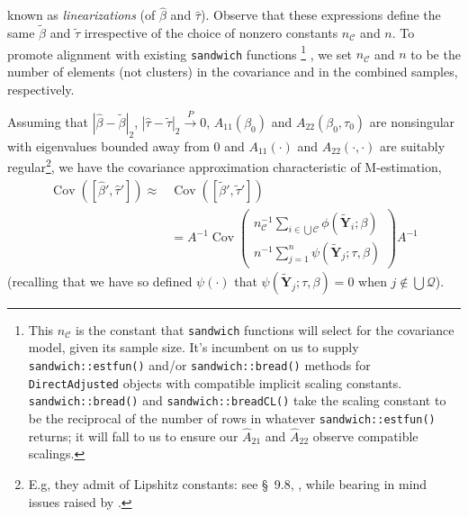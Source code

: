 \documentclass{article}
\begin{document}
known as \textit{linearizations} (of $\hat\beta$ and $\hat\tau$).
Observe that these expressions define the same $\tilde\beta$ and $\tilde\tau$
  irrespective of the choice of nonzero constants $n_{\mathcal{C}}$
  and $n$.  To promote alignment with existing \texttt{sandwich}
  functions%
  \footnote{%
    This $n_{\mathcal{C}}$ is the constant that \texttt{sandwich} functions
will select for the covariance model, given its sample size.  It's
incumbent on us to supply \texttt{sandwich::estfun()} and/or
\texttt{sandwich::bread()} methods for \texttt{DirectAdjusted} objects
with compatible implicit
scaling constants. \texttt{sandwich::bread()} and
\texttt{sandwich::breadCL()} take the scaling constant to be the
reciprocal of the number of rows in whatever
\texttt{sandwich::estfun()} returns; it will fall to us to ensure our
$\hat{A}_{21}$ and $\hat{A}_{22}$ observe compatible scalings.}%
, we set $n_{\mathcal{C}}$ and $n$ to be the number of elements
(not clusters) in the covariance and in the combined samples,
respectively.

Assuming that $|\hat\beta -\tilde\beta|_{2}$, 
$|\hat\tau -\tilde\tau|_{2} \stackrel{P}{\rightarrow} 0$,
$A_{11}(\beta_{0})$ and $A_{22}(\beta_{0}, \tau_{0})$ are nonsingular
with eigenvalues bounded away from 0 and $A_{11}(\cdot)$ and $A_{22}(\cdot, \cdot)$ are suitably
regular\footnote{E.g, they admit of Lipshitz constants: see \S~9.8,
  , while bearing in mind issues raised
  by .}, 
we have the covariance approximation characteristic of M-estimation,
\begin{align*} \operatorname{Cov}([\hat\beta',\hat\tau']) \approx&
  \operatorname{Cov}([\tilde\beta',\tilde\tau'])\\
  &=
  A^{-1} \operatorname{Cov}\left(
     \begin{array}{c}
       n_{\mathcal{C}}^{-1}\sum_{i\in \bigcup \mathcal{C}}\phi(\tilde{\mathbf{Y}}_{i}; \beta )\\
       n^{-1}\sum_{j=1}^{n}\psi(\tilde{\mathbf{Y}}_{j}; \tau, \beta )
     \end{array}
\right)A^{-1}
\end{align*}
(recalling that we have so defined $\psi(\cdot)$ that $\psi(\tilde{\mathbf{Y}}_{j}; \tau, \beta) = 0$ when
$j\not\in \bigcup \mathcal{Q}$).
\end{document}
